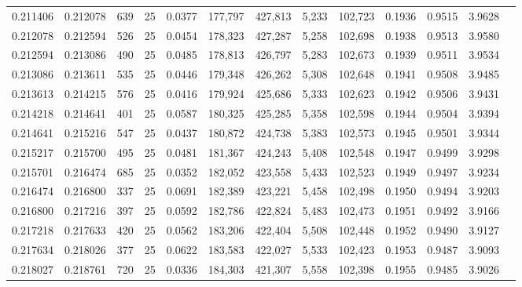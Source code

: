 \begin{tabular}{rrrrrrrrrrrrr}
0.211406 & 0.212078 &   639 &  25 &                                     0.0377 & 177,797 & 427,813 &   5,233 & 102,723 & 0.1936 & 0.9515 & 3.9628 \\
0.212078 & 0.212594 &   526 &  25 &                                     0.0454 & 178,323 & 427,287 &   5,258 & 102,698 & 0.1938 & 0.9513 & 3.9580 \\
0.212594 & 0.213086 &   490 &  25 &                                     0.0485 & 178,813 & 426,797 &   5,283 & 102,673 & 0.1939 & 0.9511 & 3.9534 \\
0.213086 & 0.213611 &   535 &  25 &                                     0.0446 & 179,348 & 426,262 &   5,308 & 102,648 & 0.1941 & 0.9508 & 3.9485 \\
0.213613 & 0.214215 &   576 &  25 &                                     0.0416 & 179,924 & 425,686 &   5,333 & 102,623 & 0.1942 & 0.9506 & 3.9431 \\
0.214218 & 0.214641 &   401 &  25 &                                     0.0587 & 180,325 & 425,285 &   5,358 & 102,598 & 0.1944 & 0.9504 & 3.9394 \\
0.214641 & 0.215216 &   547 &  25 &                                     0.0437 & 180,872 & 424,738 &   5,383 & 102,573 & 0.1945 & 0.9501 & 3.9344 \\
0.215217 & 0.215700 &   495 &  25 &                                     0.0481 & 181,367 & 424,243 &   5,408 & 102,548 & 0.1947 & 0.9499 & 3.9298 \\
0.215701 & 0.216474 &   685 &  25 &                                     0.0352 & 182,052 & 423,558 &   5,433 & 102,523 & 0.1949 & 0.9497 & 3.9234 \\
0.216474 & 0.216800 &   337 &  25 &                                     0.0691 & 182,389 & 423,221 &   5,458 & 102,498 & 0.1950 & 0.9494 & 3.9203 \\
0.216800 & 0.217216 &   397 &  25 &                                     0.0592 & 182,786 & 422,824 &   5,483 & 102,473 & 0.1951 & 0.9492 & 3.9166 \\
0.217218 & 0.217633 &   420 &  25 &                                     0.0562 & 183,206 & 422,404 &   5,508 & 102,448 & 0.1952 & 0.9490 & 3.9127 \\
0.217634 & 0.218026 &   377 &  25 &                                     0.0622 & 183,583 & 422,027 &   5,533 & 102,423 & 0.1953 & 0.9487 & 3.9093 \\
0.218027 & 0.218761 &   720 &  25 &                                     0.0336 & 184,303 & 421,307 &   5,558 & 102,398 & 0.1955 & 0.9485 & 3.9026 \\

\end{tabular}
